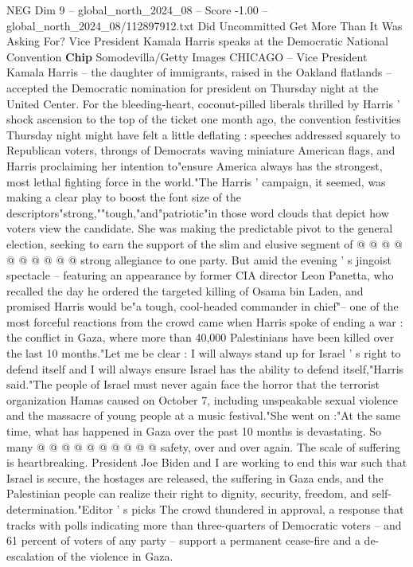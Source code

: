 \begin{textsample}{NEG Dim 9 – global\_north\_2024\_08 – Score -1.00 – global\_north\_2024\_08/112897912.txt}  \label{ex:f9_neg_261}
Did Uncommitted Get More Than It Was Asking For?
Vice President Kamala Harris speaks at the Democratic National Convention \textbf{Chip} Somodevilla/Getty Images CHICAGO -- Vice President Kamala Harris -- the daughter of immigrants, raised in the Oakland flatlands -- accepted the Democratic nomination for president on Thursday night at the United Center.
For the bleeding-heart, coconut-pilled liberals thrilled by Harris ' shock ascension to the top of the ticket one month ago, the convention festivities Thursday night might have felt a little deflating : speeches addressed squarely to Republican voters, throngs of Democrats waving miniature American flags, and Harris proclaiming her intention to"ensure America always has the strongest, most lethal fighting force in the world."The Harris ' campaign, it seemed, was making a clear play to boost the font size of the descriptors"strong,""tough,"and"patriotic"in those word clouds that depict how voters view the candidate.
She was making the predictable pivot to the general election, seeking to earn the support of the slim and elusive segment of @ @ @ @ @ @ @ @ @ @ strong allegiance to one party.
But amid the evening ' s jingoist spectacle -- featuring an appearance by former CIA director Leon Panetta, who recalled the day he ordered the targeted killing of Osama bin Laden, and promised Harris would be"a tough, cool-headed commander in chief"-- one of the most forceful reactions from the crowd came when Harris spoke of ending a war : the conflict in Gaza, where more than 40,000 Palestinians have been killed over the last 10 months."Let me be clear : I will always stand up for Israel ' s right to defend itself and I will always ensure Israel has the ability to defend itself,"Harris said."The people of Israel must never again face the horror that the terrorist organization Hamas caused on October 7, including unspeakable sexual violence and the massacre of young people at a music festival."She went on :"At the same time, what has happened in Gaza over the past 10 months is devastating.
So many @ @ @ @ @ @ @ @ @ @ safety, over and over again.
The scale of suffering is heartbreaking.
President Joe Biden and I are working to end this war such that Israel is secure, the hostages are released, the suffering in Gaza ends, and the Palestinian people can realize their right to dignity, security, freedom, and self-determination."Editor ' s picks The crowd thundered in approval, a response that tracks with polls indicating more than three-quarters of Democratic voters -- and 61 percent of voters of any party -- support a permanent cease-fire and a de-escalation of the violence in Gaza.

\end{textsample}
